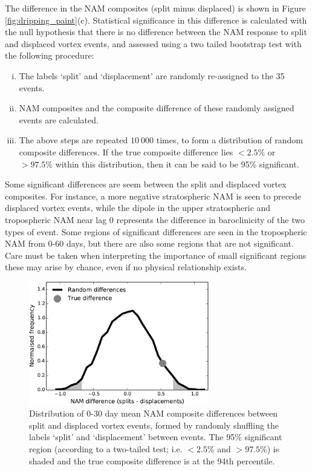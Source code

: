 The difference in the NAM composites (split minus displaced) is shown in Figure
\ref{fig:dripping_paint}(c). Statistical significance in this difference is
calculated with the null hypothesis that there is no difference between the NAM
response to split and displaced vortex events, and assessed using a two tailed
bootstrap test with the following procedure:
\begin{enumerate}[i.]
\item The labels `split' and `displacement' are randomly re-assigned to the 35
  events.
\item NAM composites and the composite difference of these randomly assigned events
  are calculated. 
\item The above steps are repeated $10~000$ times, to form a distribution
  of random composite differences. If the true composite difference lies
  $<2.5\%$ or $>97.5\%$ within this distribution, then it can be said to be 95\%
  significant.
\end{enumerate}
Some significant differences are seem between the split and displaced vortex
composites. For instance, a more negative stratospheric NAM is seen to precede
displaced vortex events, while the dipole in the upper stratospheric and
tropospheric NAM near lag 0 represents the difference in baroclinicity of the
two types of event. Some regions of significant differences are seen in the
tropospheric NAM from 0-60 days, but there are also some regions that are not
significant. Care must be taken when interpreting the importance of small
significant regions these may arise by chance, even if no physical relationship
exists. 

\begin{figure}
 \centering
 \noindent\includegraphics[width=0.7\textwidth]{figures/chapter-moments/nam_difference_sig.pdf}
 \caption[Significance of surface NAM difference following split and displaced
 vortex events.]{Distribution of 0-30 day mean NAM composite differences between
   split and displaced vortex events, formed by randomly shuffling the labels
   `split' and `displacement' between events. The 95\% significant region
   (according to a two-tailed test; i.e. $<2.5$\% and $>97.5$\%) is shaded and
   the true composite difference is at the 94th percentile.}
 \label{fig:nam_comp_diff}
\end{figure}

